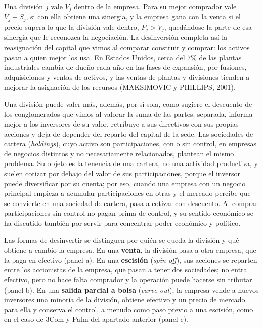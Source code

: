 \documentclass[10pt,a4paper]{article}
\begin{document}
Una división $j$ vale $V_j$ dentro de la empresa. Para su mejor comprador vale $V_j+S_j$, si con ella obtiene una sinergia, y la empresa gana con la venta si el precio supera lo que la división vale dentro, $P_j>V_j$, quedándose la parte de esa sinergia que le reconozca la negociación. La desinversión completa así la reasignación del capital que vimos al comparar construir y comprar: los activos pasan a quien mejor los usa. En Estados Unidos, cerca del $7\%$ de las plantas industriales cambia de dueño cada año en las fases de expansión, por fusiones, adquisiciones y ventas de activos, y las ventas de plantas y divisiones tienden a mejorar la asignación de los recursos (MAKSIMOVIC y PHILLIPS, 2001).

Una división puede valer más, además, por sí sola, como sugiere el descuento de los conglomerados que vimos al valorar la suma de las partes: separada, informa mejor a los inversores de su valor, retribuye a sus directivos con sus propias acciones y deja de depender del reparto del capital de la sede. Las sociedades de cartera (\textit{holdings}), cuyo activo son participaciones, con o sin control, en empresas de negocios distintos y no necesariamente relacionados, plantean el mismo problema. Su objeto es la tenencia de una cartera, no una actividad productiva, y suelen cotizar por debajo del valor de sus participaciones, porque el inversor puede diversificar por su cuenta; por eso, cuando una empresa con un negocio principal empieza a acumular participaciones en otras y el mercado percibe que se convierte en una sociedad de cartera, pasa a cotizar con descuento. Al comprar participaciones sin control no pagan prima de control, y su sentido económico se ha discutido también por servir para concentrar poder económico y político.

Las formas de desinvertir se distinguen por quién se queda la división y qué obtiene a cambio la empresa. En una \textbf{venta}, la división pasa a otra empresa, que la paga en efectivo (panel a). En una \textbf{escisión} (\textit{spin-off}), sus acciones se reparten entre los accionistas de la empresa, que pasan a tener dos sociedades; no entra efectivo, pero no hace falta comprador y la operación puede hacerse sin tributar (panel b). En una \textbf{salida parcial a bolsa} (\textit{carve-out}), la empresa vende a nuevos inversores una minoría de la división, obtiene efectivo y un precio de mercado para ella y conserva el control, a menudo como paso previo a una escisión, como en el caso de 3Com y Palm del apartado anterior (panel c).
\end{document}
